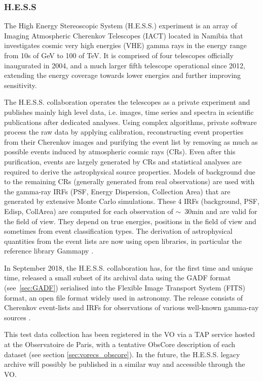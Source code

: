 \documentclass[11pt,a4paper]{ivoa}
\begin{document}
\subsubsection{H.E.S.S}
\label{sec:hess}

The High Energy Stereoscopic System (H.E.S.S.) experiment is an array of Imaging Atmospheric Cherenkov Telescopes (IACT)
located in Namibia that investigates cosmic very high energies (VHE) gamma rays in the energy range from 10s of GeV to
100 of TeV. It is comprised of four telescopes officially inaugurated in 2004, and a much larger fifth telescope
operational since 2012, extending the energy coverage towards lower energies and further improving sensitivity.

The H.E.S.S. collaboration operates the telescopes as a private experiment and publishes mainly high level data,
i.e. images, time series and spectra in scientific publications after dedicated analyses. Using complex algorithms,
private software process the raw data by applying calibration, reconstructing event properties from their Cherenkov
images and purifying the event list by removing as much as possible events induced by atmospheric cosmic rays (CRs). Even
after this purification, events are largely generated by CRs and statistical analyses are required to derive
the astrophysical source properties. Models of background due to the remaining CRs
(generally generated from real observations) are used with the gamma-ray IRFs (PSF, Energy Dispersion, Collection Area)
that are generated by extensive Monte Carlo simulations. These 4 IRFs (background, PSF, Edisp, CollArea) are computed
for each observation of $\sim$~30min and are valid for the field of view. They depend on true energies, positions in the
field of view and sometimes from event classification types. The derivation of astrophysical quantities from
the event lists are now using open libraries, in particular the reference library Gammapy \citep{gammapy:2023}.

In September 2018, the H.E.S.S. collaboration has, for the first time and unique time, released a small subset of its
archival data using the GADF format (see~\ref{sec:GADF}) serialised into the Flexible Image Transport System (FITS) format,
an open file format widely used in astronomy. The release consists of Cherenkov event-lists and IRFs for observations of
various well-known gamma-ray sources \citep{hess-zenodo.1421098}.

This test data collection has been registered in the VO via a TAP service hosted at the Observatoire de Paris, with a
tentative ObsCore description of each dataset (see section \ref{sec:vorecs_obscore}). In the future, the H.E.S.S. legacy archive will possibly be published in a similar way and accessible through the VO.
\end{document}
